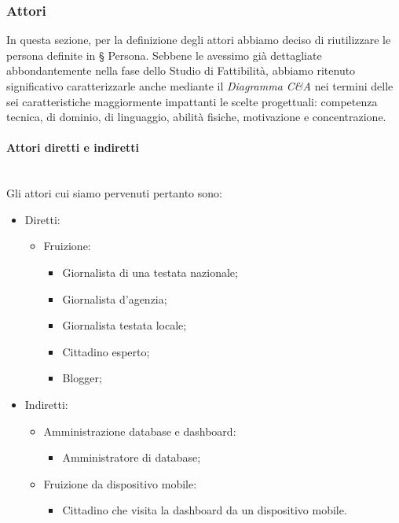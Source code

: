 \subsubsection{Attori}
In questa sezione, per la definizione degli attori abbiamo deciso di riutilizzare le persona definite in § Persona.
Sebbene le avessimo già dettagliate abbondantemente nella fase dello Studio di Fattibilità, abbiamo ritenuto significativo caratterizzarle anche mediante il \textit{Diagramma C\&A} nei termini delle sei caratteristiche maggiormente impattanti le scelte progettuali: competenza tecnica, di dominio, di linguaggio, abilità fisiche, motivazione e concentrazione.

\paragraph{Attori diretti e indiretti}\mbox{}\\
Gli attori cui siamo pervenuti pertanto sono:
\begin{itemize}
    \item Diretti:
    \begin{itemize}
        \item Fruizione:
        \begin{itemize}
            \item Giornalista di una testata nazionale;
            \item Giornalista d'agenzia;
            \item Giornalista testata locale;
            \item Cittadino esperto;
            \item Blogger;
        \end{itemize}
    \end{itemize}
    \item Indiretti:
    \begin{itemize}
        \item Amministrazione database e dashboard:
        \begin{itemize}
            \item Amministratore di database;
        \end{itemize}
        \item Fruizione da dispositivo mobile:
        \begin{itemize}
            \item Cittadino che visita la dashboard da un dispositivo mobile.
        \end{itemize}
    \end{itemize}
\end{itemize}

